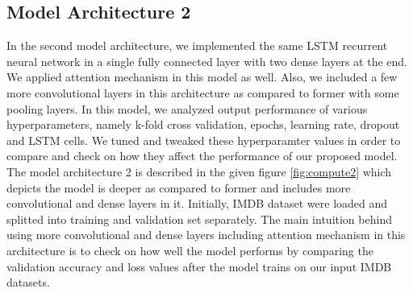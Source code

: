 \documentclass{article}
\begin{document}
\subsection{Model Architecture 2}
In the second model architecture, we implemented the same LSTM recurrent neural network in a single fully connected layer with two dense layers at the end. We  applied attention mechanism in this model as well. Also, we included a few more convolutional layers in this architecture as compared to former with some pooling layers. In this model, we analyzed output performance of various hyperparameters, namely k-fold cross validation, epochs, learning rate, dropout and LSTM cells. We tuned and tweaked these hyperparamter values in order to compare and check on how they affect the performance of our proposed model.\\

The model architecture 2 is described in the given figure \ref{fig:compute2} which depicts the model is deeper as compared to former and includes more convolutional and dense layers in it. Initially, IMDB dataset were loaded and splitted into training and validation set separately. The main intuition behind using more convolutional and dense layers including attention mechanism in this architecture is to check on how well the model performs by comparing the validation accuracy and loss values after the model trains on our input IMDB datasets. 
\end{document}
